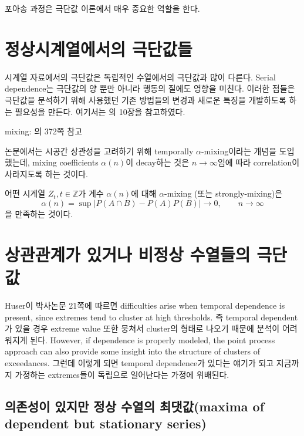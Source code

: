 \documentclass[b5paper,]{scrbook}
\theoremstyle{plain}
\theoremstyle{definition}
\numberwithin{equation}{section}
\let\BeginKnitrBlock\begin \let\EndKnitrBlock\end
\begin{document}
포아송 과정은 극단값 이론에서 매우 중요한 역할을 한다.

\hypertarget{timeextremes}{%
\chapter{정상시계열에서의 극단값들}\label{timeextremes}}

시계열 자료에서의 극단값은 독립적인 수열에서의 극단값과 많이 다른다. Serial dependence는 극단값의 양 뿐만 아니라 행동의 질에도 영향을 미친다. 이러한 점들은 극단값을 분석하기 위해 사용했던 기존 방법들의 변경과 새로운 특징을 개발하도록 하는 필요성을 만든다. 여기서는 \citep{Beirlant2004}의 10장을 참고하였다.

mixing: \citep{Beirlant2004}의 372쪽 참고

\citep{Huser2013} 논문에서는 시공간 상관성을 고려하기 위해 temporally \(\alpha\)-mixing이라는 개념을 도입했는데, mixing coefficients \(\alpha(n)\)이 decay하는 것은 \(n\rightarrow \infty\)임에 따라 correlation이 사라지도록 하는 것이다.

\BeginKnitrBlock{definition}[alpha-mixing]
\protect\hypertarget{def:unnamed-chunk-454}{}{\label{def:unnamed-chunk-454} {} }어떤 시계열 \(Z_{t}, t\in\mathbb{Z}\)가 계수 \(\alpha(n)\)에 대해 \(\alpha\)-mixing (또는 strongly-mixing)은
\[\alpha(n)=\sup | P(A\cap B) - P(A)P(B) | \rightarrow 0, \qquad{n\rightarrow\infty}\]
을 만족하는 것이다.
\EndKnitrBlock{definition}

\hypertarget{depextremes}{%
\chapter{상관관계가 있거나 비정상 수열들의 극단값}\label{depextremes}}

Huser이 박사논문 21쪽에 따르면 difficulties arise when temporal dependence is present, since extremes tend to cluster at high thresholds. 즉 temporal dependent가 있을 경우 extreme value 또한 뭉쳐서 cluster의 형태로 나오기 때문에 분석이 어려워지게 된다. However, if dependence is properly modeled, the point process approach can also provide some insight into the structure of clusters of exceedances. 그런데 이렇게 되면 temporal dependence가 있다는 얘기가 되고 지금까지 가정하는 extremes들이 독립으로 일어난다는 가정에 위배된다.

\hypertarget{----maxima-of-dependent-but-stationary-series}{%
\section{의존성이 있지만 정상 수열의 최댓값(maxima of dependent but stationary series)}\label{----maxima-of-dependent-but-stationary-series}}
\end{document}
